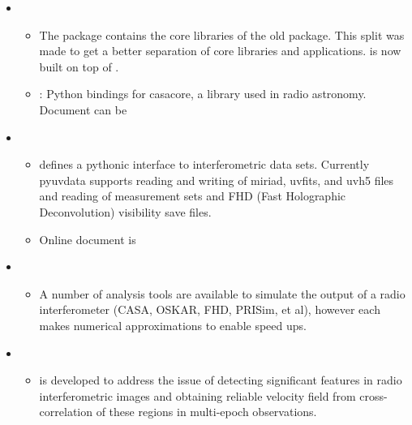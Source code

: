 \documentclass[letterpaper,10pt,english]{sphinxmanual}
\begin{document}
\begin{itemize}
\item {} 
\begin{itemize}
\item {} 
The  package contains the core libraries of the old
 package. This split was made to get a better
separation of core libraries and applications.  is now
built on top of .

\item {} 
: Python bindings for casacore, a library used
in radio astronomy. Document can be 

\end{itemize}

\item {} 
\begin{itemize}
\item {} 
 defines a pythonic interface to interferometric data
sets. Currently pyuvdata supports reading and writing of miriad,
uvfits, and uvh5 files and reading of  measurement sets
and FHD (Fast Holographic Deconvolution) visibility save files.

\item {} 
Online document is

\end{itemize}

\item {} 
\begin{itemize}
\item {} 
A number of analysis tools are available to simulate the output of
a radio interferometer (CASA, OSKAR, FHD, PRISim, et al), however
each makes numerical approximations to enable speed ups.

\end{itemize}

\item {} 
\begin{itemize}
\item {} 
 is developed to address the issue of detecting
significant features in radio interferometric images and obtaining
reliable velocity field from cross-correlation of these regions in
multi-epoch observations.


\end{itemize}
\end{itemize}
\end{document}
